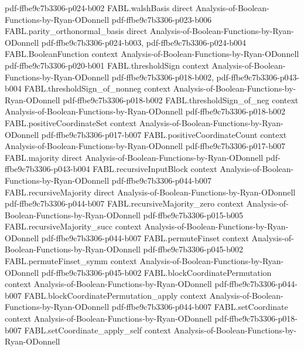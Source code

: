 \begin{theorem}
  {pdf-ffbe9c7b3306-p024-b002}
\proofstep
  {FABL.walshBasis}
  {direct}
  {Analysis-of-Boolean-Functions-by-Ryan-ODonnell}
  {pdf-ffbe9c7b3306-p023-b006}
\proofstep
  {FABL.parity_orthonormal_basis}
  {direct}
  {Analysis-of-Boolean-Functions-by-Ryan-ODonnell}
  {pdf-ffbe9c7b3306-p024-b003,
    pdf-ffbe9c7b3306-p024-b004}
\proofstep
  {FABL.BooleanFunction}
  {context}
  {Analysis-of-Boolean-Functions-by-Ryan-ODonnell}
  {pdf-ffbe9c7b3306-p020-b001}
\proofstep
  {FABL.thresholdSign}
  {context}
  {Analysis-of-Boolean-Functions-by-Ryan-ODonnell}
  {pdf-ffbe9c7b3306-p018-b002,
    pdf-ffbe9c7b3306-p043-b004}
\proofstep
  {FABL.thresholdSign_of_nonneg}
  {context}
  {Analysis-of-Boolean-Functions-by-Ryan-ODonnell}
  {pdf-ffbe9c7b3306-p018-b002}
\proofstep
  {FABL.thresholdSign_of_neg}
  {context}
  {Analysis-of-Boolean-Functions-by-Ryan-ODonnell}
  {pdf-ffbe9c7b3306-p018-b002}
\proofstep
  {FABL.positiveCoordinateSet}
  {context}
  {Analysis-of-Boolean-Functions-by-Ryan-ODonnell}
  {pdf-ffbe9c7b3306-p017-b007}
\proofstep
  {FABL.positiveCoordinateCount}
  {context}
  {Analysis-of-Boolean-Functions-by-Ryan-ODonnell}
  {pdf-ffbe9c7b3306-p017-b007}
\proofstep
  {FABL.majority}
  {direct}
  {Analysis-of-Boolean-Functions-by-Ryan-ODonnell}
  {pdf-ffbe9c7b3306-p043-b004}
\proofstep
  {FABL.recursiveInputBlock}
  {context}
  {Analysis-of-Boolean-Functions-by-Ryan-ODonnell}
  {pdf-ffbe9c7b3306-p044-b007}
\proofstep
  {FABL.recursiveMajority}
  {direct}
  {Analysis-of-Boolean-Functions-by-Ryan-ODonnell}
  {pdf-ffbe9c7b3306-p044-b007}
\proofstep
  {FABL.recursiveMajority_zero}
  {context}
  {Analysis-of-Boolean-Functions-by-Ryan-ODonnell}
  {pdf-ffbe9c7b3306-p015-b005}
\proofstep
  {FABL.recursiveMajority_succ}
  {context}
  {Analysis-of-Boolean-Functions-by-Ryan-ODonnell}
  {pdf-ffbe9c7b3306-p044-b007}
\proofstep
  {FABL.permuteFinset}
  {context}
  {Analysis-of-Boolean-Functions-by-Ryan-ODonnell}
  {pdf-ffbe9c7b3306-p045-b002}
\proofstep
  {FABL.permuteFinset_symm}
  {context}
  {Analysis-of-Boolean-Functions-by-Ryan-ODonnell}
  {pdf-ffbe9c7b3306-p045-b002}
\proofstep
  {FABL.blockCoordinatePermutation}
  {context}
  {Analysis-of-Boolean-Functions-by-Ryan-ODonnell}
  {pdf-ffbe9c7b3306-p044-b007}
\proofstep
  {FABL.blockCoordinatePermutation_apply}
  {context}
  {Analysis-of-Boolean-Functions-by-Ryan-ODonnell}
  {pdf-ffbe9c7b3306-p044-b007}
\proofstep
  {FABL.setCoordinate}
  {context}
  {Analysis-of-Boolean-Functions-by-Ryan-ODonnell}
  {pdf-ffbe9c7b3306-p018-b007}
\proofstep
  {FABL.setCoordinate_apply_self}
  {context}
  {Analysis-of-Boolean-Functions-by-Ryan-ODonnell}

\end{theorem}
